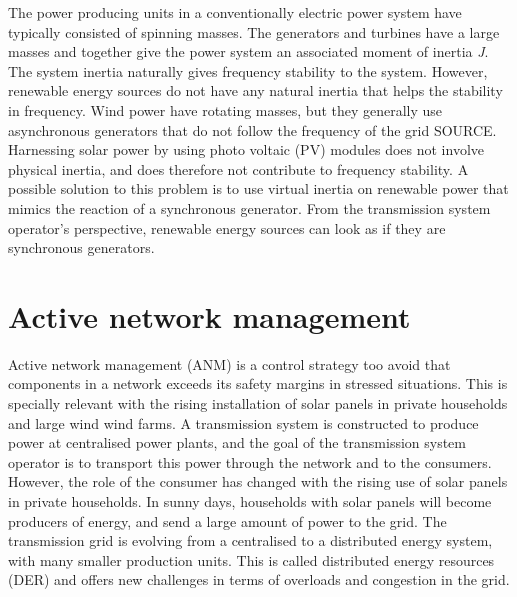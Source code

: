 \documentclass[class=book, crop=false]{standalone}
\begin{document}
The power producing units in a conventionally electric power system have typically consisted of spinning masses. The generators and turbines have a large masses and together give the power system an associated moment of inertia \textit{J}. The system inertia naturally gives frequency stability to the system. However, renewable energy sources do not have any natural inertia that helps the stability in frequency. Wind power have rotating masses, but they generally use asynchronous generators that do not follow the frequency of the grid SOURCE. Harnessing solar power by using photo voltaic (PV) modules does not involve physical inertia, and does therefore not contribute to frequency stability. A possible solution to this problem is to use virtual inertia on renewable power that mimics the reaction of a synchronous generator\cite{virtual_inertia}. From the transmission system operator's perspective, renewable energy sources can look as if they are synchronous generators.


\section{Active network management}
Active network management (ANM) is a control strategy too avoid that components in a network exceeds its safety margins in stressed situations\cite{active_network_management}. This is specially relevant with the rising installation of solar panels in private households and large wind wind farms. A transmission system is constructed to produce power at centralised power plants, and the goal of the transmission system operator is to transport this power through the network and to the consumers. However, the role of the consumer has changed with the rising use of solar panels in private households. In sunny days, households with solar panels will become producers of energy, and send a large amount of power to the grid. The transmission grid is evolving from a centralised to a distributed energy system, with many smaller production units. This is called distributed energy resources (DER) and offers new challenges in terms of overloads and congestion in the grid. 
\end{document}
